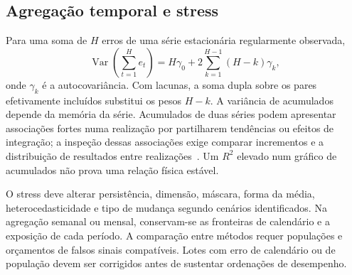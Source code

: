 \subsection{Agregação temporal e stress}
\label{sec:mat-agregacao-stress}
Para uma soma de $H$ erros de uma série estacionária regularmente observada,
\begin{equation}
\operatorname{Var}\!\left(\sum_{t=1}^{H}e_t\right)
=H\gamma_0+2\sum_{k=1}^{H-1}(H-k)\gamma_k,
\label{eq:mat-variancia-soma}
\end{equation}
onde $\gamma_k$ é a autocovariância. Com lacunas, a soma dupla sobre os pares efetivamente incluídos substitui os pesos $H-k$. A variância de acumulados depende da memória da série. Acumulados de duas séries podem apresentar associações fortes numa realização por partilharem tendências ou efeitos de integração; a inspeção dessas associações exige comparar incrementos e a distribuição de resultados entre realizações~\parencite{Yule1926,GrangerNewbold1974}. Um $R^2$ elevado num gráfico de acumulados não prova uma relação física estável.

O stress deve alterar persistência, dimensão, máscara, forma da média, heterocedasticidade e tipo de mudança segundo cenários identificados. Na agregação semanal ou mensal, conservam-se as fronteiras de calendário e a exposição de cada período. A comparação entre métodos requer populações e orçamentos de falsos sinais compatíveis. Lotes com erro de calendário ou de população devem ser corrigidos antes de sustentar ordenações de desempenho.


\clearpage
{}

